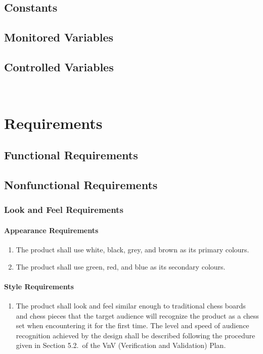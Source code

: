 \documentclass[12pt]{article}
\begin{document}
\subsection{Constants}
\subsection{Monitored Variables}
\subsection{Controlled Variables}

~\newpage

\section{Requirements}
\subsection{Functional Requirements}
\subsection{Nonfunctional Requirements}

\setcounter{vnvSectionNfr}{1}

\setcounter{nfrNum}{1}

\subsubsection{Look and Feel Requirements}
\label{NFR_LF}
\paragraph{Appearance Requirements}
\begin{enumerate}[{LF}1., leftmargin=2\parindent]
    \item The product shall use white, black, grey, and brown as its primary colours.
    \item The product shall use green, red, and blue as its secondary colours.
\end{enumerate}

\paragraph{Style Requirements}
\begin{enumerate}[{LF}1., leftmargin=2\parindent, resume]
    \item The product shall look and feel similar enough to traditional chess boards and chess pieces that the target audience will 
    recognize the product as a chess set when encountering it for the first time. The level and speed of audience recognition achieved 
    by the design shall be described following the procedure given in Section 5.2.\thevnvSectionNfr{}~of the VnV 
    (Verification and Validation) Plan.
\end{enumerate}
\end{document}
